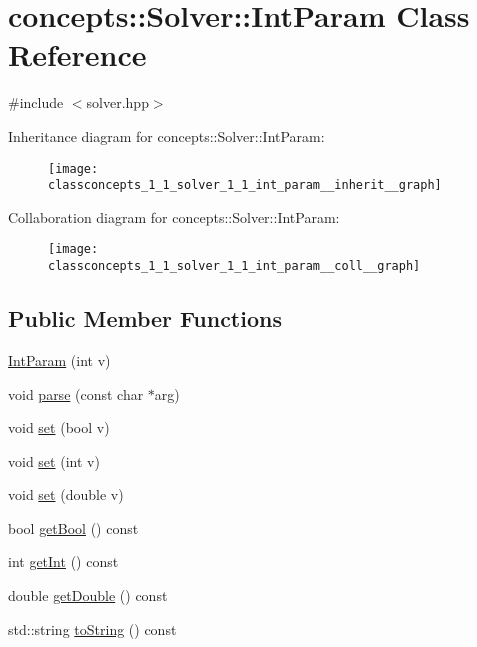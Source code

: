 \hypertarget{classconcepts_1_1_solver_1_1_int_param}{}\section{concepts\+:\+:Solver\+:\+:Int\+Param Class Reference}
\label{classconcepts_1_1_solver_1_1_int_param}


{\ttfamily \#include $<$solver.\+hpp$>$}



Inheritance diagram for concepts\+:\+:Solver\+:\+:Int\+Param\+:\nopagebreak
\begin{figure}[H]
\begin{center}
\leavevmode
\texttt{[image: classconcepts\_1\_1\_solver\_1\_1\_int\_param\_\_inherit\_\_graph]}
\end{center}
\end{figure}


Collaboration diagram for concepts\+:\+:Solver\+:\+:Int\+Param\+:\nopagebreak
\begin{figure}[H]
\begin{center}
\leavevmode
\texttt{[image: classconcepts\_1\_1\_solver\_1\_1\_int\_param\_\_coll\_\_graph]}
\end{center}
\end{figure}
\subsection*{Public Member Functions}
\begin{DoxyCompactItemize}
\item 
\hyperlink{classconcepts_1_1_solver_1_1_int_param_ae0ca602547edf8a03c323f6bd93e332e}{Int\+Param} (int v)
\item 
void \hyperlink{classconcepts_1_1_solver_1_1_int_param_a81c8c88fe73047c6c1b8d5a87d70be24}{parse} (const char $\ast$arg)
\item 
void \hyperlink{classconcepts_1_1_solver_1_1_int_param_aad1fef920b810b30289a2863d4ab6a52}{set} (bool v)
\item 
void \hyperlink{classconcepts_1_1_solver_1_1_int_param_aad283b6869373847cf9543e889f9fc91}{set} (int v)
\item 
void \hyperlink{classconcepts_1_1_solver_1_1_int_param_aa678f7356cd371ac1bc11e86e0109ae7}{set} (double v)
\item 
bool \hyperlink{classconcepts_1_1_solver_1_1_int_param_aa991108bd194ff4f9cb21230549a74f5}{get\+Bool} () const
\item 
int \hyperlink{classconcepts_1_1_solver_1_1_int_param_a8ff3d45bcc5fc60750183e61ff61b48e}{get\+Int} () const
\item 
double \hyperlink{classconcepts_1_1_solver_1_1_int_param_a70b472a5cce3b44e0d9a08f5da70e1a4}{get\+Double} () const
\item 
std\+::string \hyperlink{classconcepts_1_1_solver_1_1_int_param_a84740f9d96205d4b7fbc1e011a82e08b}{to\+String} () const
\end{DoxyCompactItemize}
